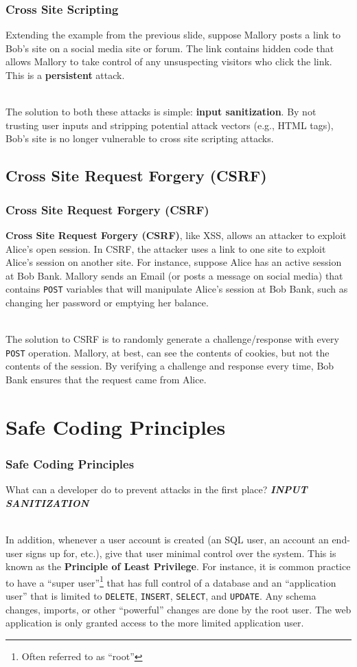 \documentclass[aspectratio=169]{beamer}
\begin{document}
\begin{frame}
\frametitle{Cross Site Scripting}
Extending the example from the previous slide, suppose Mallory posts a link to Bob's site on a social media site or forum. The link contains hidden code that allows Mallory to take control of any unsuspecting visitors who click the link. This is a \textbf{persistent} attack.

\pause
\mbox{}\\
The solution to both these attacks is simple: \textbf{input sanitization}. By not trusting user inputs and stripping potential attack vectors (e.g., HTML tags), Bob's site is no longer vulnerable to cross site scripting attacks.
\end{frame}

\subsection{Cross Site Request Forgery (CSRF)}
\begin{frame}
\frametitle{Cross Site Request Forgery (CSRF)}
\textbf{Cross Site Request Forgery (CSRF)}, like XSS, allows an attacker to exploit Alice's open session. In CSRF, the attacker uses a link to one site to exploit Alice's session on another site. For instance, suppose Alice has an active session at Bob Bank. Mallory sends an Email (or posts a message on social media) that contains \texttt{POST} variables that will manipulate Alice's session at Bob Bank, such as changing her password or emptying her balance.

\pause
\mbox{}\\
The solution to CSRF is to randomly generate a challenge/response with every \texttt{POST} operation. Mallory, at best, can see the contents of cookies, but not the contents of the session. By verifying a challenge and response every time, Bob Bank ensures that the request came from Alice.
\end{frame}

\section{Safe Coding Principles}
\begin{frame}
\frametitle{Safe Coding Principles}
What can a developer do to prevent attacks in the first place?
\pause
\textbf{\emph{INPUT SANITIZATION}}

\pause
\mbox{}\\
In addition, whenever a user account is created (an SQL user, an account an end-user signs up for, etc.), give that user minimal control over the system. This is known as the \textbf{Principle of Least Privilege}. \cite{owasp} For instance, it is common practice to have a ``super user''\footnote{Often referred to as ``root''} that has full control of a database and an ``application user'' that is limited to \texttt{DELETE}, \texttt{INSERT}, \texttt{SELECT}, and \texttt{UPDATE}. Any schema changes, imports, or other ``powerful'' changes are done by the root user. The web application is only granted access to the more limited application user.
\end{frame}
\end{document}
